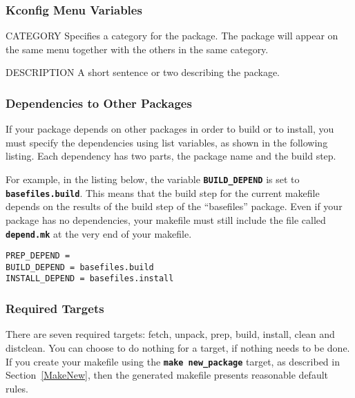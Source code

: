 \documentclass[a4paper,10pt]{article}
\newenvironment{Description}[1][\quad]{%
  \begin{list}{}{%
      \renewcommand{\makelabel}[1]{\textbf{##1}\hfill}%
      \settowidth{\labelwidth}{\textbf{#1}}%
      \setlength{\leftmargin}{\labelwidth+\labelsep}%
  }%
}{%
  \end{list}%
}
\newcommand{\fw}{\tt\bf}
\begin{document}
\subsubsection{Kconfig Menu Variables}

    \begin{Description}[DESCRIPTIONXXX]
    \item[CATEGORY]
      Specifies a category for the package. The package will appear on
      the same menu together with the others in the same category.
    \item[DESCRIPTION]
      A short sentence or two describing the package.
    \end{Description}

\subsubsection{Dependencies to Other Packages}

    If your package depends on other packages in order to build or to
    install, you must specify the dependencies using list variables,
    as shown in the following listing. Each dependency has two parts,
    the package name and the build step.

    For example, in the listing below, the variable {\fw BUILD\_DEPEND}
    is set to {\fw basefiles.build}. This means that the build step
    for the current makefile depends on the results of the build step
    of the ``basefiles'' package. Even if your package has no
    dependencies, your makefile must still include the file called
    {\fw depend.mk} at the very end of your makefile.

\begin{lstlisting}
PREP_DEPEND =
BUILD_DEPEND = basefiles.build
INSTALL_DEPEND = basefiles.install
\end{lstlisting}

\subsubsection{Required Targets} \label{RequiredTargets}

    There are seven required targets: fetch, unpack, prep, build,
    install, clean and distclean. You can choose to do nothing for a
    target, if nothing needs to be done. If you create your makefile
    using the {\fw make new\_package} target, as described in
    Section~\ref{MakeNew}, then the generated makefile presents
    reasonable default rules.
\end{document}

